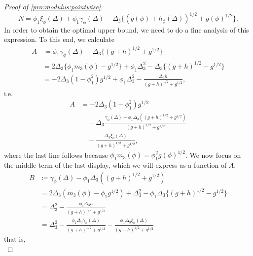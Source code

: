 \documentclass[journal]{IEEEtran}
\newcommand{\1}{\boldsymbol{1}}
\begin{document}
\begin{proof}[Proof of \cref{pro:modulus:pointwise}]
	\begin{equation*}
		N%
		= \phi_1 \xi_{\phi}(\Delta) + \phi_1\gamma_{\phi}(\Delta)%
		- \Delta_3\big\{ (g(\phi) + h_{\phi}(\Delta))^{1/2} + g(\phi)^{1/2} \big\}.
	\end{equation*}
	In order to obtain the optimal upper bound, we need to do a fine analysis of this expression. To this end, we calculate
	\begin{align*}
		A%
		&\coloneqq \phi_1\gamma_{\phi}(\Delta) - \Delta_3\{ (g+h)^{1/2} + g^{1/2} \}\\
		&=2 \Delta_3\{\phi_1 m_3(\phi) - g^{1/2} \} +  \phi_1\Delta_3^2 - \Delta_3\{(g+h)^{1/2} - g^{1/2}\}\\
		&=-2\Delta_3(1-\phi_1^2)g^{1/2}%
		+ \phi_1 \Delta_3^2%
		- \frac{\Delta_3h}{(g+h)^{1/2} + g^{1/2}},
	\end{align*}
        i.e.\
        \begin{align*}
          A%
          &=-2\Delta_3(1-\phi_1^2)g^{1/2}\\
          &\quad
                  - \Delta_3 \frac{\gamma_{\phi}(\Delta) - \phi_1\Delta_3((g+h)^{1/2}+g^{1/2}  )}{(g+h)^{1/2} + g^{1/2}}\\%
          &\quad
		- \frac{\Delta_3 \xi_{\phi}(\Delta)}{(g+h)^{1/2} + g^{1/2}},
        \end{align*}
	where the last line follows because $\phi_1m_3(\phi) = \phi_1^2g(\phi)^{1/2}$.
	We now focus on the middle term of the last display, which we will express as a function of $A$.
	\begin{align*}
		B%
		&\coloneqq \gamma_{\phi}(\Delta) - \phi_1\Delta_3((g+h)^{1/2}+g^{1/2}  )\\%
		&= 2\Delta_3(m_3(\phi) - \phi_1g^{1/2}) + \Delta_3^2 - \phi_1\Delta_3 \{(g+h)^{ 1/2 } -g^{1/2} \}\\
		&= \Delta_3^2 - \frac{\phi_1 \Delta_3 h}{(g+h)^{1/2} + g^{1/2} }\\
		&= \Delta_3^2 - \frac{\phi_1 \Delta_3 \gamma_{\phi}(\Delta)}{(g+h)^{1/2} +g^{1/2} }%
		- \frac{\phi_1\Delta_3 \xi_{\phi}(\Delta)}{(g+h)^{1/2} + g^{1/2}}%
	\end{align*}
        that is,
        \begin{equation*}

\end{equation*}
\end{proof}
\end{document}
